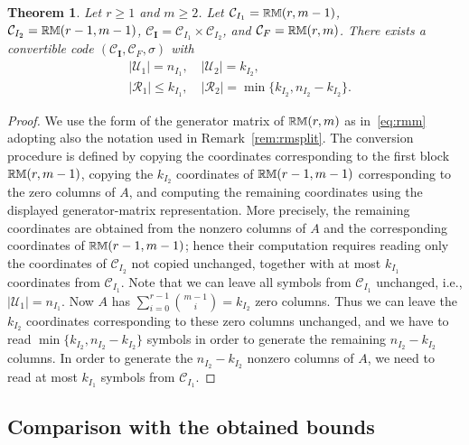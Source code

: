 \documentclass[conference, 10pt]{IEEEtran}
\theoremstyle{plain}
\newtheorem{theorem}{Theorem}
\theoremstyle{definition}
\newcommand{\RM}{{\text{\small $\mathbb{RM}$}}}
\newcommand{\mC}{\mathcal{C}}
\newcommand{\mU}{\mathcal{U}}
\newcommand{\mR}{\mathcal{R}}
\begin{document}
\begin{theorem} \label{thm:rmc}
    Let $r \ge 1$ and $m \ge 2$. Let $\mC_{I_1}=\RM(r,m-1)$, $\mC_{I_2}=\RM(r-1,m-1)$, $\mC_{\textbf{I}}=\mC_{I_1} \times \mC_{I_2}$, and $\mC_F=\RM(r,m)$. There exists a convertible code $(\mC_{\textbf{I}},\mC_F,\sigma)$ with 
    \begin{align*}
        &|\mU_1| = n_{I_1}, \quad |\mU_2| = k_{I_2}, \\
        &|\mR_1| \le  k_{I_1}, \quad |\mR_2| = \min\{k_{I_2},n_{I_2}-k_{I_2}\}.
    \end{align*}
\end{theorem}
\begin{proof}
    We use the form of the generator matrix of $\RM(r,m)$ as in~\eqref{eq:rmm} adopting also the notation used in Remark~\ref{rem:rmsplit}. The conversion procedure is defined by copying the coordinates corresponding to the first block $\RM(r,m-1)$, copying the $k_{I_2}$ coordinates of $\RM(r-1,m-1)$ corresponding to the zero columns of $A$, and computing the remaining coordinates using the displayed generator-matrix representation. More precisely, the remaining coordinates are obtained from the nonzero columns of $A$ and the corresponding coordinates of $\RM(r-1,m-1)$; hence their computation requires reading only the coordinates of $\mathcal{C}_{I_2}$ not copied unchanged, together with at most $k_{I_1}$ coordinates from $\mathcal{C}_{I_1}$. Note that we can leave all symbols from $\mC_{I_1}$ unchanged, i.e., $|\mU_1|  = n_{I_1}$. Now $A$ has $\sum_{i=0}^{r-1} \binom{m-1}{i}=k_{I_2}$ zero columns. Thus we can leave the $k_{I_2}$ coordinates corresponding to these zero columns unchanged, and we have to read $\min\{k_{I_2},n_{I_2}-k_{I_2}\}$ symbols in order to generate the remaining $n_{I_2}-k_{I_2}$ columns. In order to generate the  $n_{I_2}-k_{I_2}$ nonzero columns of $A$, we need to read at most $k_{I_1}$ symbols from $\mC_{I_1}$. 
\end{proof}

\subsection{Comparison with the obtained bounds}\label{sec:comp}
\end{document}
